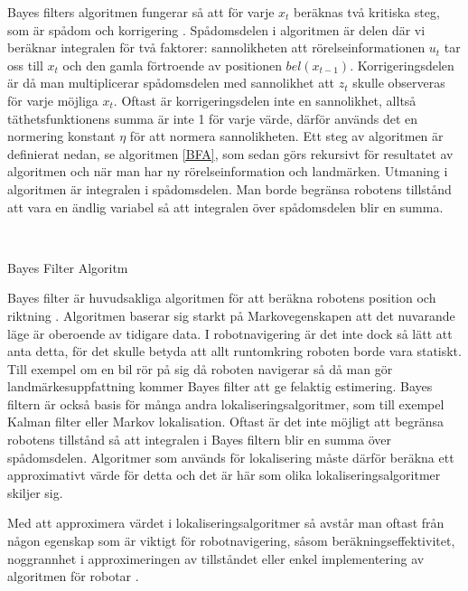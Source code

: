 Bayes filters algoritmen fungerar så att för varje $x_t$ beräknas två kritiska steg, som är spådom och korrigering \citep{ProbabilisticRobotics}. Spådomsdelen i algoritmen är delen där vi beräknar integralen för två faktorer: sannolikheten att rörelseinformationen $u_t$ tar oss till $x_t$ och den gamla förtroende av positionen $bel(x_{t-1})$. Korrigeringsdelen är då man multiplicerar spådomsdelen med sannolikhet att $z_t$ skulle observeras för varje möjliga $x_t$. Oftast är korrigeringsdelen inte en sannolikhet, alltså täthetsfunktionens summa är inte 1 för varje värde, därför används det en normering konstant $\eta$ för att normera sannolikheten. Ett steg av algoritmen är definierat nedan, se algoritmen \ref{BFA}, som sedan görs rekursivt för resultatet av algoritmen och när man har ny rörelseinformation och landmärken. Utmaning i algoritmen är integralen i spådomsdelen. Man borde begränsa robotens tillstånd att vara en ändlig variabel så att integralen över spådomsdelen blir en summa. 

\begin{algorithm}[H]
    \SetAlgoLined
    \label{BFA}
     \\
    \caption{Bayes Filter Algoritm}
\end{algorithm}

Bayes filter är huvudsakliga algoritmen för att beräkna robotens position och riktning \citep{ProbabilisticRobotics}. Algoritmen baserar sig starkt på Markovegenskapen att det nuvarande läge är oberoende av tidigare data. I robotnavigering är det inte dock så lätt att anta detta, för det skulle betyda att allt runtomkring roboten borde vara statiskt. Till exempel om en bil rör på sig då roboten navigerar så då man gör landmärkesuppfattning kommer Bayes filter att ge felaktig estimering. Bayes filtern är också basis för många andra lokaliseringsalgoritmer, som till exempel Kalman filter eller Markov lokalisation. Oftast är det inte möjligt att begränsa robotens tillstånd så att integralen i Bayes filtern blir en summa över spådomsdelen. Algoritmer som används för lokalisering måste därför beräkna ett approximativt värde för detta och det är här som olika lokaliseringsalgoritmer skiljer sig.

Med att approximera värdet i lokaliseringsalgoritmer så avstår man oftast från någon egenskap som är viktigt för robotnavigering, såsom beräkningseffektivitet, noggrannhet i approximeringen av tillståndet eller enkel implementering av algoritmen för robotar \citep{ProbabilisticRobotics}. 

